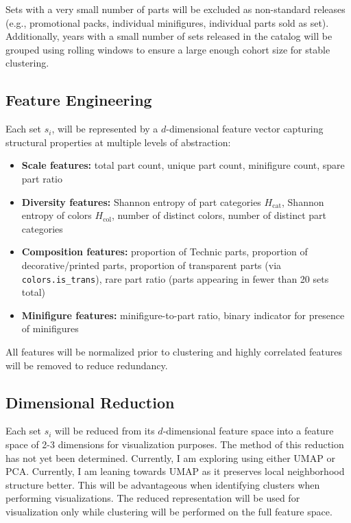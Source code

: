 \documentclass[11pt, letterpaper]{article}
\begin{document}
Sets with a very small number of parts will be excluded as non-standard releases (e.g., promotional packs, individual minifigures, individual parts sold as set). Additionally, years with a small number of sets released in the catalog will be grouped using rolling windows to ensure a large enough cohort size for stable clustering.

\subsection{Feature Engineering}

Each set $s_i$, will be represented by a $d$-dimensional feature vector capturing structural properties at multiple levels of abstraction: 

\begin{itemize}
    \item \textbf{Scale features:} total part count, unique part count, minifigure count, spare part ratio
    \item \textbf{Diversity features:} Shannon entropy of part categories $H_\text{cat}$, Shannon entropy of colors $H_\text{col}$, number of distinct colors, number of distinct part categories
    \item \textbf{Composition features:} proportion of Technic parts, proportion of decorative/printed parts, proportion of transparent parts (via \texttt{colors.is\_trans}), rare part ratio (parts appearing in fewer than 20 sets total)
    \item \textbf{Minifigure features:} minifigure-to-part ratio, binary indicator for presence of minifigures
\end{itemize}

All features will be normalized prior to clustering and highly correlated features will be removed to reduce redundancy.

\subsection{Dimensional Reduction}

Each set $s_i$ will be reduced from its $d$-dimensional feature space into a feature space of 2-3 dimensions for visualization purposes. The method of this reduction has not yet been determined. Currently, I am exploring using either UMAP \cite{mcinnes2018umap} or PCA. Currently, I am leaning towards UMAP as it preserves local neighborhood structure better. This will be advantageous when identifying clusters when performing visualizations. The reduced representation will be used for visualization only while clustering will be performed on the full feature space.
\end{document}
